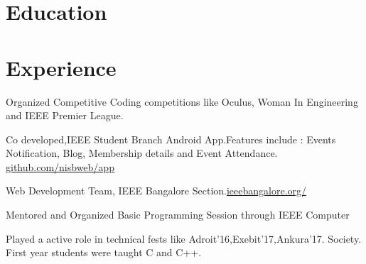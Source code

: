 \documentclass[]{deedy-resume-openfont}
\begin{document}
%
%

%
%






\section{Education}
\sectionsep

\section{Experience}

\begin{tightemize}
\item Organized Competitive Coding competitions like Oculus, Woman In Engineering
and IEEE Premier League.
\item Co developed,IEEE Student Branch Android App.Features include : Events
Notification, Blog, Membership details and Event Attendance.
\href{https://www.github.com/nisbweb/app}{github.com/nisbweb/app}
\item Web Development Team, IEEE Bangalore Section.\href{https://www.ieeebangalore.org/}{ieeebangalore.org/}
\item Mentored and Organized Basic Programming Session through IEEE Computer
\item Played a active role in technical fests like Adroit'16,Exebit'17,Ankura'17.
Society. First year students were taught C and C++.
\end{tightemize}
\sectionsep
\end{document}
